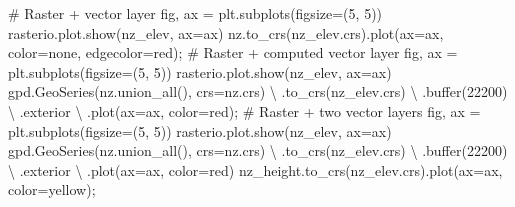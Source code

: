 \documentclass[
  letterpaper,
]{krantz}
\newenvironment{Shaded}{\begin{snugshade}}{\end{snugshade}}
\newcommand{\BuiltInTok}[1]{\textcolor[rgb]{0.00,0.23,0.31}{#1}}
\newcommand{\CommentTok}[1]{\textcolor[rgb]{0.37,0.37,0.37}{#1}}
\newcommand{\DecValTok}[1]{\textcolor[rgb]{0.68,0.00,0.00}{#1}}
\newcommand{\NormalTok}[1]{\textcolor[rgb]{0.00,0.23,0.31}{#1}}
\newcommand{\OperatorTok}[1]{\textcolor[rgb]{0.37,0.37,0.37}{#1}}
\newcommand{\StringTok}[1]{\textcolor[rgb]{0.13,0.47,0.30}{#1}}
\begin{document}
\begin{Shaded}
\begin{Highlighting}[]
\CommentTok{\# Raster + vector layer}
\NormalTok{fig, ax }\OperatorTok{=}\NormalTok{ plt.subplots(figsize}\OperatorTok{=}\NormalTok{(}\DecValTok{5}\NormalTok{, }\DecValTok{5}\NormalTok{))}
\NormalTok{rasterio.plot.show(nz\_elev, ax}\OperatorTok{=}\NormalTok{ax)}
\NormalTok{nz.to\_crs(nz\_elev.crs).plot(ax}\OperatorTok{=}\NormalTok{ax, color}\OperatorTok{=}\StringTok{\textquotesingle{}none\textquotesingle{}}\NormalTok{, edgecolor}\OperatorTok{=}\StringTok{\textquotesingle{}red\textquotesingle{}}\NormalTok{)}\OperatorTok{;}
\CommentTok{\# Raster + computed vector layer}
\NormalTok{fig, ax }\OperatorTok{=}\NormalTok{ plt.subplots(figsize}\OperatorTok{=}\NormalTok{(}\DecValTok{5}\NormalTok{, }\DecValTok{5}\NormalTok{))}
\NormalTok{rasterio.plot.show(nz\_elev, ax}\OperatorTok{=}\NormalTok{ax)}
\NormalTok{gpd.GeoSeries(nz.union\_all(), crs}\OperatorTok{=}\NormalTok{nz.crs) }\OperatorTok{\textbackslash{}}
\NormalTok{    .to\_crs(nz\_elev.crs) }\OperatorTok{\textbackslash{}}
\NormalTok{    .}\BuiltInTok{buffer}\NormalTok{(}\DecValTok{22200}\NormalTok{) }\OperatorTok{\textbackslash{}}
\NormalTok{    .exterior }\OperatorTok{\textbackslash{}}
\NormalTok{    .plot(ax}\OperatorTok{=}\NormalTok{ax, color}\OperatorTok{=}\StringTok{\textquotesingle{}red\textquotesingle{}}\NormalTok{)}\OperatorTok{;}
\CommentTok{\# Raster + two vector layers}
\NormalTok{fig, ax }\OperatorTok{=}\NormalTok{ plt.subplots(figsize}\OperatorTok{=}\NormalTok{(}\DecValTok{5}\NormalTok{, }\DecValTok{5}\NormalTok{))}
\NormalTok{rasterio.plot.show(nz\_elev, ax}\OperatorTok{=}\NormalTok{ax)}
\NormalTok{gpd.GeoSeries(nz.union\_all(), crs}\OperatorTok{=}\NormalTok{nz.crs) }\OperatorTok{\textbackslash{}}
\NormalTok{    .to\_crs(nz\_elev.crs) }\OperatorTok{\textbackslash{}}
\NormalTok{    .}\BuiltInTok{buffer}\NormalTok{(}\DecValTok{22200}\NormalTok{) }\OperatorTok{\textbackslash{}}
\NormalTok{    .exterior }\OperatorTok{\textbackslash{}}
\NormalTok{    .plot(ax}\OperatorTok{=}\NormalTok{ax, color}\OperatorTok{=}\StringTok{\textquotesingle{}red\textquotesingle{}}\NormalTok{)}
\NormalTok{nz\_height.to\_crs(nz\_elev.crs).plot(ax}\OperatorTok{=}\NormalTok{ax, color}\OperatorTok{=}\StringTok{\textquotesingle{}yellow\textquotesingle{}}\NormalTok{)}\OperatorTok{;}
\end{Highlighting}
\end{Shaded}
\end{document}
